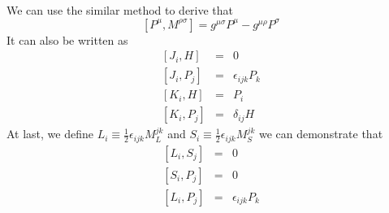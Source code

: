 \documentclass{article}
\begin{document}
We can use the similar method to derive that
\[[P^{\mu},M^{\rho \sigma}] = g^{\mu \sigma}P^{\mu} - g^{\mu \rho}P^{\sigma}\]
It can also be written as
\begin{eqnarray}
\left[J_i,H\right] &=& 0 \nonumber \\
\left[J_i,P_j\right] &=& \epsilon_{ijk}P_k \nonumber \\
\left[K_i,H\right] &=& P_i \nonumber \\
\left[K_i,P_j\right] &=& \delta_{ij}H \nonumber
\end{eqnarray}
At last, we define $L_i \equiv \frac{1}{2} \epsilon_{ijk} M_L^{jk}$ and $S_i \equiv \frac{1}{2} \epsilon_{ijk} M_S^{jk}$
we can demonstrate that
\begin{eqnarray}
\left[L_i,S_j\right] &=& 0 \nonumber \\
\left[S_i,P_j\right] &=& 0 \nonumber \\
\left[L_i,P_j\right] &=& \epsilon_{ijk}P_k \nonumber
\end{eqnarray}
\end{document}
